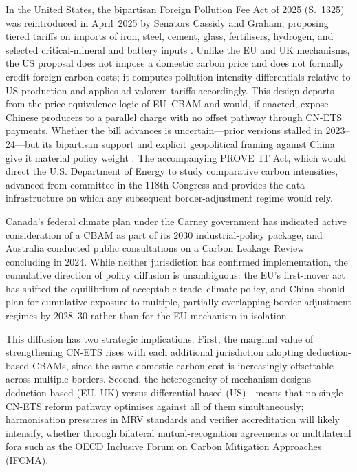 \documentclass[letterpaper, 10pt, conference]{ieeeconf}
\begin{document}
In the United States, the bipartisan Foreign Pollution Fee Act of
2025 (S.~1325) was reintroduced in April~2025 by Senators Cassidy and
Graham, proposing tiered tariffs on imports of iron, steel,
cement, glass, fertilisers, hydrogen, and selected critical-mineral
and battery inputs \citep{Cassidy2025}. Unlike the EU and UK
mechanisms, the US proposal does not impose a domestic carbon price
and does not formally credit foreign carbon costs; it computes
pollution-intensity differentials relative to US production and
applies ad valorem tariffs accordingly. This design departs from the
price-equivalence logic of EU~CBAM and would, if enacted, expose
Chinese producers to a parallel charge with no offset pathway through
CN-ETS payments. Whether the bill advances is uncertain---prior
versions stalled in 2023--24---but its bipartisan support and explicit
geopolitical framing against China give it material policy weight
\citep{CSIS2024}. The accompanying PROVE~IT Act, which would direct
the U.S. Department of Energy to study comparative carbon intensities,
advanced from committee in the 118th Congress and provides the data
infrastructure on which any subsequent border-adjustment regime would
rely.

Canada's federal climate plan under the Carney government has
indicated active consideration of a CBAM as part of its 2030
industrial-policy package, and Australia conducted public
consultations on a Carbon Leakage Review concluding in 2024. While
neither jurisdiction has confirmed implementation, the cumulative
direction of policy diffusion is unambiguous: the EU's first-mover
act has shifted the equilibrium of acceptable trade--climate policy,
and China should plan for cumulative exposure to multiple, partially
overlapping border-adjustment regimes by 2028--30 rather than for the
EU mechanism in isolation.

This diffusion has two strategic implications. First, the marginal
value of strengthening CN-ETS rises with each additional jurisdiction
adopting deduction-based CBAMs, since the same domestic carbon cost
is increasingly offsettable across multiple borders. Second, the
heterogeneity of mechanism designs---deduction-based (EU, UK) versus
differential-based (US)---means that no single CN-ETS reform pathway
optimises against all of them simultaneously; harmonisation pressures
in MRV standards and verifier accreditation will likely intensify,
whether through bilateral mutual-recognition agreements or
multilateral fora such as the OECD Inclusive Forum on Carbon
Mitigation Approaches (IFCMA).
\end{document}
